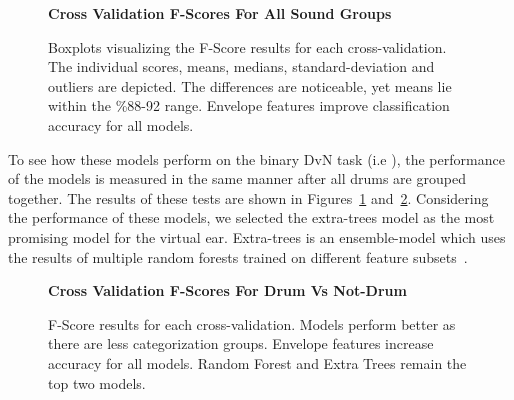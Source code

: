 \documentclass[\main/thesis.tex]{subfiles}
\begin{document}
\begin{figure}[htbp!]
    \begin{center}
    \textbf{Cross Validation F-Scores For All Sound Groups}\par\medskip
    \caption{Boxplots visualizing the F-Score results for each cross-validation. The individual scores, means, medians, standard-deviation and outliers are depicted. The differences are noticeable, yet means lie within the \%88-92 range. Envelope features improve classification accuracy for all models. }
    \label{fig:f1_allg_box}
    \end{center}
\end{figure}

To see how these models perform on the binary DvN task (i.e \decfirst), the performance of the models is measured in the same manner after all drums are grouped together. The results of these tests are shown in Figures~\ref{fig:f1_allg_box} and~\ref{fig:f1_dvn_box}. Considering the performance of these models, we selected the extra-trees model as the most promising model for the virtual ear. Extra-trees is an ensemble-model which uses the results of multiple random forests trained on different feature subsets~\cite{geurts2006extremely,pedregosa2011scikit}.

\begin{figure}[htbp]   
    \begin{center}
        \textbf{Cross Validation F-Scores For Drum Vs Not-Drum}
    \caption{F-Score results for each cross-validation. Models perform better as there are less categorization groups. Envelope features increase accuracy for all models. Random Forest and Extra Trees remain the top two models. }
    \label{fig:f1_dvn_box}
    \end{center}
\end{figure}
\end{document}
